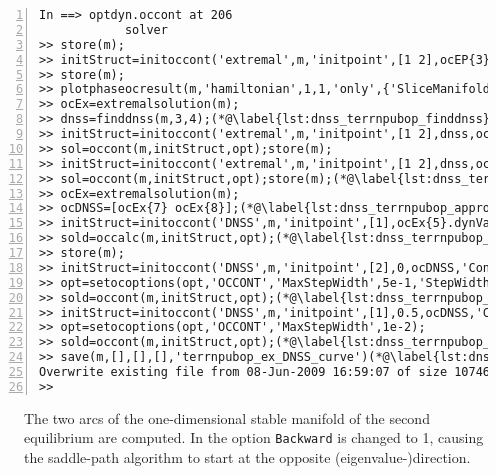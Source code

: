 \begin{lstlisting}[numbers=left]
In ==> optdyn.occont at 206
            solver
>> store(m);
>> initStruct=initoccont('extremal',m,'initpoint',[1 2],ocEP{3}.dynVar(1:2,1),sol,'ContinuationType','f');
>> store(m);
>> plotphaseocresult(m,'hamiltonian',1,1,'only',{'SliceManifold'},'onlyindex',{[3 4]});set(gca,'XLim',[1 1.5],'YLim',[0.152 0.162])(*@\label{lst:dnss_terrnpubop_plotham}@*)
>> ocEx=extremalsolution(m);
>> dnss=finddnss(m,3,4);(*@\label{lst:dnss_terrnpubop_finddnss}@*)
>> initStruct=initoccont('extremal',m,'initpoint',[1 2],dnss,ocEx{5},'ContinuationType','f');(*@\label{lst:dnss_terrnpubop_calcdnss1}@*)
>> sol=occont(m,initStruct,opt);store(m);
>> initStruct=initoccont('extremal',m,'initpoint',[1 2],dnss,ocEx{6},'ContinuationType','f');
>> sol=occont(m,initStruct,opt);store(m);(*@\label{lst:dnss_terrnpubop_calcdnss2}@*)
>> ocEx=extremalsolution(m);
>> ocDNSS=[ocEx{7} ocEx{8}];(*@\label{lst:dnss_terrnpubop_approxdnss1}@*)
>> initStruct=initoccont('DNSS',m,'initpoint',[1],ocEx{5}.dynVar(1,1),ocDNSS,'ContinuationType','f');(*@\label{lst:dnss_terrnpubop_initdnss}@*)
>> sold=occalc(m,initStruct,opt);(*@\label{lst:dnss_terrnpubop_occalcdnss}@*)
>> store(m);
>> initStruct=initoccont('DNSS',m,'initpoint',[2],0,ocDNSS,'ContinuationType','al')(*@\label{lst:dnss_terrnpubop_initoccontdnss}@*)
>> opt=setocoptions(opt,'OCCONT','MaxStepWidth',5e-1,'StepWidth',1e-4,'MeanIteration',80);(*@\label{lst:dnss_terrnpubop_setocoptionsdnss}@*)
>> sold=occont(m,initStruct,opt);(*@\label{lst:dnss_terrnpubop_occontdnss1}@*)
>> initStruct=initoccont('DNSS',m,'initpoint',[1],0.5,ocDNSS,'ContinuationType','al')
>> opt=setocoptions(opt,'OCCONT','MaxStepWidth',1e-2);
>> sold=occont(m,initStruct,opt);(*@\label{lst:dnss_terrnpubop_occontdnss2}@*)
>> save(m,[],[],[],'terrnpubop_ex_DNSS_curve')(*@\label{lst:dnss_terrnpubop_save}@*)
Overwrite existing file from 08-Jun-2009 16:59:07 of size 1074617 with new size 1074617?  y/(n): y
>>
\end{lstlisting}
\begin{description}
	\item[] The two arcs of the one-dimensional stable manifold of the second equilibrium are computed. In  the option \lstinline+Backward+ is changed to 1, causing the saddle-path algorithm to start at the opposite (eigenvalue-)direction.
	\item[] 
	\item[] 
\end{description}

